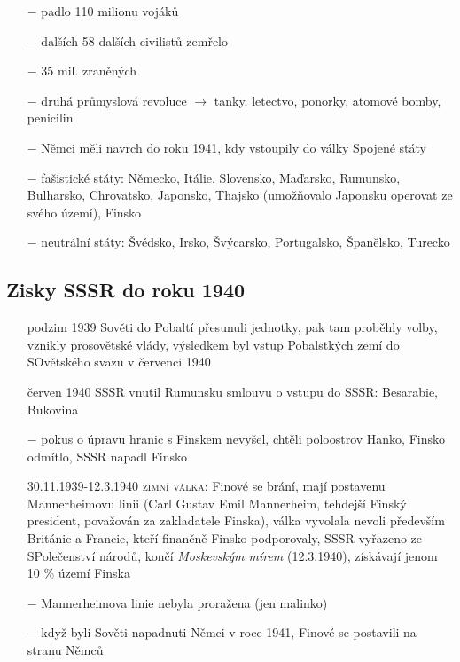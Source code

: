 \documentclass{article}
\begin{document}
\begin{itemize}
    \vspace{-0.5em}
    \setlength\itemsep{0.15em}
    \item[$-$] padlo 110 milionu vojáků
    \item[$-$] dalších 58 dalších civilistů zemřelo
    \item[$-$] 35 mil. zraněných
    \item[$-$] druhá průmyslová revoluce $\rightarrow$ tanky, letectvo, ponorky, atomové bomby, penicilin
    \item[$-$] Němci měli navrch do roku 1941, kdy vstoupily do války Spojené státy
    \item[$-$] fašistické státy: Německo, Itálie, Slovensko, Maďarsko, Rumunsko, Bulharsko, Chrovatsko, Japonsko, Thajsko (umožňovalo Japonsku operovat ze svého území), Finsko
    \item[$-$] neutrální státy: Švédsko, Irsko, Švýcarsko, Portugalsko, Španělsko, Turecko
\end{itemize}

\subsection*{Zisky SSSR do roku 1940}
\begin{itemize}
    \vspace{-0.5em}
    \setlength\itemsep{0.15em}
    \item[podzim 1939] Sověti do Pobaltí přesunuli jednotky, pak tam proběhly volby, vznikly prosovětské vlády, výsledkem byl vstup Pobalstkých zemí do SOvětského svazu v červenci 1940
    \item[červen 1940] SSSR vnutil Rumunsku smlouvu o vstupu do SSSR: Besarabie, Bukovina
    \item[$-$] pokus o úpravu hranic s Finskem nevyšel, chtěli poloostrov Hanko, Finsko odmítlo, SSSR napadl Finsko
    \item[30.11.1939-12.3.1940] \textsc{zimní válka}: Finové se brání, mají postavenu Mannerheimovu linii (Carl Gustav Emil Mannerheim, tehdejší Finský president, považován za zakladatele Finska), válka vyvolala nevoli především Británie a Francie, kteří finančně Finsko podporovaly, SSSR vyřazeno ze SPolečenství národů, končí \textit{Moskevským mírem} (12.3.1940), získávají jenom 10 \% území Finska
    \item[$-$] Mannerheimova linie nebyla proražena (jen malinko)
    \item[$-$] když byli Sověti napadnuti Němci v roce 1941, Finové se postavili na stranu Němců
\end{itemize}
\end{document}
